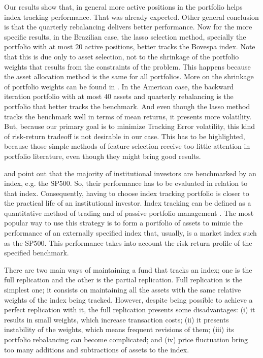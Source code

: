 \documentclass[12pt,oneside,a4paper]{memoir}
\begin{document}
Our results show that, in general more active positions in the portfolio helps index tracking performance. 
That was already expected.
Other general conclusion is that the quarterly rebalancing delivers better performance.
Now for the more specific results, in the Brazilian case, the lasso selection method, specially the portfolio with at most $20$ active positions, better tracks the Bovespa index.
Note that this is due only to asset selection, not to the shrinkage of the portfolio weights that results from the constraints of the problem.
This happens because the asset allocation method is the same for all portfolios.
More on the shrinkage of portfolio weights can be found in .
In the American case, the backward iteration portfolio with at most $40$ assets and quarterly rebalancing is the portfolio that better tracks the benchmark.
And even though the lasso method tracks the benchmark well in terms of mean returns, it presents more volatility.
But, because our primary goal is to minimize Tracking Error volatility, this kind of risk-return tradeoff is not desirable in our case.
This has to be highlighted, because those simple methods of feature selection receive too little attention in portfolio literature, even though they might bring good results.

 and  point out that the majority of institutional investors are benchmarked by an index, e.g. the SP500.
So, their performance has to be evaluated in relation to that index.
Consequently, having to choose index tracking portfolio is closer to the practical life of an institutional investor.
Index tracking can be defined as a quantitative method of trading and of passive portfolio management \cite{PLS10, nnl14}.
The most popular way to use this strategy is to form a portfolio of assets to mimic the performance of an externally specified index that, usually, is a market index such as the SP500.
This performance takes into account the risk-return profile of the specified benchmark.

There are two main ways of maintaining a fund that tracks an index; one is the full replication and the other is the partial replication.
Full replication is the simplest one; it consists on maintaining all the assets with the same relative weights of the index being tracked.
However, despite being possible to achieve a perfect replication with it, the full replication presents some disadvantages:
(i) it results in small weights, which increase transaction costs;
(ii) it presents instability of the weights, which means frequent revisions of them;
(iii) its portfolio rebalancing can become complicated; 
and (iv) price fluctuation bring too many additions and subtractions of assets to the index.
\end{document}

